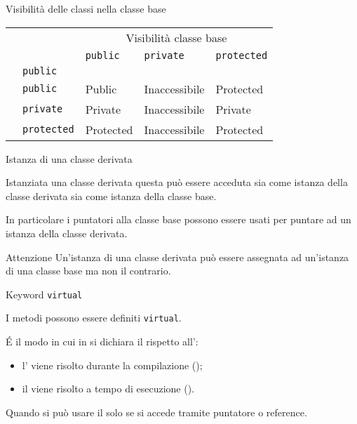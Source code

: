 \documentclass[xcolor={dvipsnames, svgnames, x11names, table}, 10pt]{beamer}
\begin{document}
\begin{frame}{Visibilità delle classi nella classe base}

\begin{center}
    \begin{tabular}{@{} *{5}{l} @{}}
    \toprule
        & & \multicolumn{3}{c}{Visibilità classe base}\\
    \cmidrule(l){3-5}
        \multirow{5}{*}{\rotatebox[origin=c]{90}{\parbox[c]{3.5cm}{\centering Ereditarietà classe derivata}}} & & \texttt{public} & \texttt{private} & \texttt{protected} \\
    \cmidrule(l){3-5}
        & \texttt{public} & & & \\
    \cmidrule(l){2-5}
        & \texttt{public} & Public & Inaccessibile & Protected \\
    \cmidrule(l){2-5}
        & \texttt{private} & Private & Inaccessibile & Private \\
    \cmidrule(l){2-5}
        & \texttt{protected} & Protected & Inaccessibile & Protected \\
    \bottomrule
    \end{tabular}
\end{center}
    
\end{frame}

\begin{frame}{Istanza di una classe derivata}

Istanziata una classe derivata questa può essere acceduta sia come istanza della classe derivata sia come istanza della classe base.

In particolare i puntatori alla classe base possono essere usati per puntare ad un istanza della classe derivata.

\begin{alertblock}{Attenzione}
Un'istanza di una classe derivata può essere assegnata ad un'istanza di una classe base ma non il contrario.
\end{alertblock}

\end{frame}

\begin{frame}{Keyword \texttt{virtual}}

I metodi possono essere definiti \texttt{virtual}.

\'{E} il modo in cui in \cplusplus si dichiara il  rispetto all':
\begin{itemize}
    \item l'\textbf{} viene risolto durante la compilazione ();
    \item il \textbf{} viene risolto a tempo di esecuzione ().
\end{itemize}

\begin{block}{Quando si può usare il }
     solo se si accede tramite puntatore o reference.
\end{block}

\end{frame}
\end{document}

